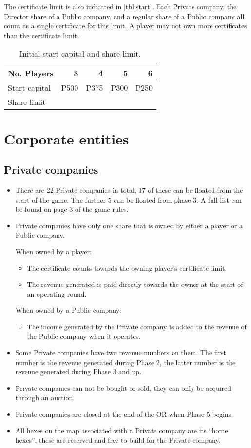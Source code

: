 \documentclass[a4paper]{article}
\begin{document}
The certificate limit is also indicated in \autoref{tbl:start}. Each Private
company, the Director share of a Public company, and a regular share of a Public
company all count as a single certificate for this limit. A player may not own
more certificates than the certificate limit.

\begin{table}
	\centering
	\caption{Initial start capital and share limit.}
	\label{tbl:start}
	\begin{tabular}{l|r|r|r|r}
	No. Players & 3 & 4 & 5 & 6 \\ \hline
	Start capital & P500 & P375 & P300 & P250 \\
	Share limit &  &  &  &  \\ %
	\end{tabular}
\end{table}

\section{Corporate entities}
\subsection{Private companies}
\begin{itemize}
	\item There are 22 Private companies in total, 17 of these can be floated
	from the start of the game. The further 5 can be floated from phase 3. A
	full list can be found on page 3 of the game rules.
	\item Private companies have only one share that is owned by either a player
	or a Public company.
	
	When owned by a player:
	\begin{itemize}
		\item The certificate counts towards the owning player's certificate
		limit.
		\item The revenue generated is paid directly towards the owner at the
		start of an operating round.
	\end{itemize}
	When owned by a Public company:
	\begin{itemize}
		\item The income generated by the Private company is added to the
		revenue of the Public company when it operates.
	\end{itemize}
	
	\item Some Private companies have two revenue numbers on them. The first
	number is the revenue generated during Phase 2, the latter number is the
	revenue generated during Phase 3 and up.
	\item Private companies can not be bought or sold, they can only be acquired
	through an auction.
	\item Private companies are closed at the end of the OR when Phase 5 begins.
	\item All hexes on the map associated with a Private company are its ``home
	hexes'', these are reserved and free to build for the Private company.
\end{itemize}
\end{document}
